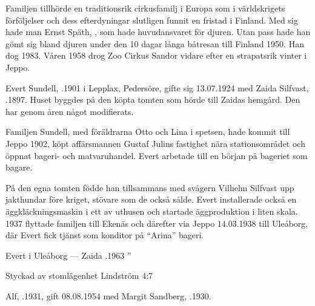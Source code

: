 Familjen tillhörde en traditionsrik cirkusfamilj i Europa som i världskrigets förföljelser och dess efterdyningar slutligen funnit en fristad i Finland. Med sig hade man Ernst Späth, , som hade huvudansvaret för djuren. Utan pass hade han gömt sig bland djuren under den 10 dagar långa båtresan till Finland 1950. Han dog 1983. Våren 1958 drog Zoo Cirkus Sandor vidare efter en strapatsrik vinter i Jeppo.


%
Evert Sundell, .1901 i Lepplax, Pedersöre, gifte sig 13.07.1924 med Zaida Silfvast, .1897. Huset byggdes på den köpta tomten som hörde till Zaidas hemgård. Den har genom åren något modifierats.

Familjen Sundell, med föräldrarna Otto och Lina i spetsen, hade kommit till Jeppo 1902, köpt affärsmannen Gustaf Julins fastighet nära stationsområdet och öppnat bageri- och matvaruhandel. Evert arbetade till en början på bageriet som bagare.

På den egna tomten födde han tillsammans med svågern Vilhelm Silfvast upp jakthundar före kriget, stövare som de också sålde. Evert installerade också en äggkläckningsmaskin i ett av uthusen och startade äggproduktion i liten skala. 1937 flyttade familjen till Ekenäs och därefter via Jeppo 14.03.1938 till Uleåborg, där Evert fick tjänst som konditor på ``Arina'' bageri.
\begin{jhchildren}
  \item {}
  \item {}
  \item {}
\end{jhchildren}
Evert  i Uleåborg  ---  Zaida .1963         ”



%

Styckad av stomlägenhet Lindström 4:7


%
Alf, .1931, gift 08.08.1954 med Margit Sandberg, .1930.

